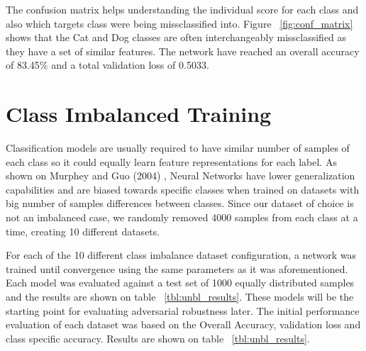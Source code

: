 The confusion matrix helps understanding the individual score for each class and also which targets class were being missclassified into. Figure ~\ref{fig:conf_matrix} shows that the Cat and Dog classes are often interchangeably missclassified as they have a set of similar features. The network have reached an overall accuracy of 83.45\% and a total validation loss of 0.5033.


\section{Class Imbalanced Training}

Classification models are usually required to have similar number of samples of each class so it could equally learn feature representations for each label. As shown on Murphey and Guo (2004) \cite{murphey2004}, Neural Networks have lower generalization capabilities and are biased towards specific classes when trained on datasets with big number of samples differences between classes. Since our dataset of choice is not an imbalanced case, we randomly removed 4000 samples from each class at a time, creating 10 different datasets.


For each of the 10 different class imbalance dataset configuration, a network was trained until convergence using the same parameters as it was aforementioned. Each model was evaluated against a test set of 1000 equally distributed samples and the results are shown on table ~\ref{tbl:unbl_results}. These models will be the starting point for evaluating adversarial robustness later. The initial performance evaluation of each dataset was based on the Overall Accuracy, validation loss and class specific accuracy. Results are shown on table ~\ref{tbl:unbl_results}.


